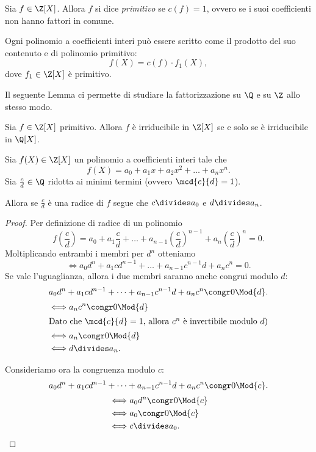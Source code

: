 \begin{definition}
    Sia $f \in \Z[X]$. Allora $f$ si dice \emph{primitivo} se $c(f) = 1$, ovvero se i suoi coefficienti non hanno fattori in comune.
\end{definition}

\begin{remark}
    Ogni polinomio a coefficienti interi può essere scritto come il prodotto del suo contenuto e di polinomio primitivo: \[
        f(X) = c(f) \cdot f_1(X),    
    \] dove $f_1 \in \Z[X]$ è primitivo.
\end{remark}

Il seguente Lemma ci permette di studiare la fattorizzazione su $\Q$ e su $\Z$ allo stesso modo.
\begin{theorem}
     Sia $f \in \Z[X]$ primitivo. Allora $f$ è irriducibile in $\Z[X]$ se e solo se è irriducibile in $\Q[X]$.
\end{theorem}

\begin{proposition}
    Sia $f(X) \in \Z[X]$ un polinomio a coefficienti interi tale che \[
        f(X) = a_0 + a_1x + a_2x^2 + \dots + a_nx^n.    
    \] Sia $\frac{c}{d} \in \Q$ ridotta ai minimi termini (ovvero $\mcd{c}{d} = 1$). 
    
    Allora se $\frac{c}{d}$ è una radice di $f$ segue che $c \divides a_0$ e $d \divides a_n$.
\end{proposition}
\begin{proof}
    Per definizione di radice di un polinomio \[
        f\left(\frac{c}{d}\right) = a_0 + a_1\frac{c}{d} + \dots + a_{n-1}\left(\frac{c}{d}\right)^{n-1} + a_n\left(\frac{c}{d}\right)^n = 0.
    \]
    Moltiplicando entrambi i membri per $d^n$ otteniamo \[
        \iff a_0d^n + a_1cd^{n-1} + \dots + a_{n-1}c^{n-1}d + a_nc^n = 0.
    \]
    Se vale l'uguaglianza, allora i due membri saranno anche congrui modulo $d$: \[
        a_0d^n + a_1cd^{n-1} + \dots + a_{n-1}c^{n-1}d + a_nc^n \congr 0 \Mod{d}.
    \]
    \begin{align*}
        \iff &a_nc^n \congr 0 \Mod{d} \\
        \intertext{Dato che $\mcd{c}{d} = 1$, allora $c^n$ è invertibile modulo $d$)}
        \iff &a_n \congr 0 \Mod{d}\\
        \iff &d \divides a_n.
    \end{align*}

    Consideriamo ora la congruenza modulo $c$: \[
        a_0d^n + a_1cd^{n-1} + \dots + a_{n-1}c^{n-1}d + a_nc^n \congr 0 \Mod{c}.
    \]
    \begin{align*}
        \iff &a_0d^n \congr 0 \Mod{c}\\
        \iff &a_0 \congr 0 \Mod{c} \\
        \iff &c \divides a_0. \qedhere
    \end{align*}
\end{proof}

